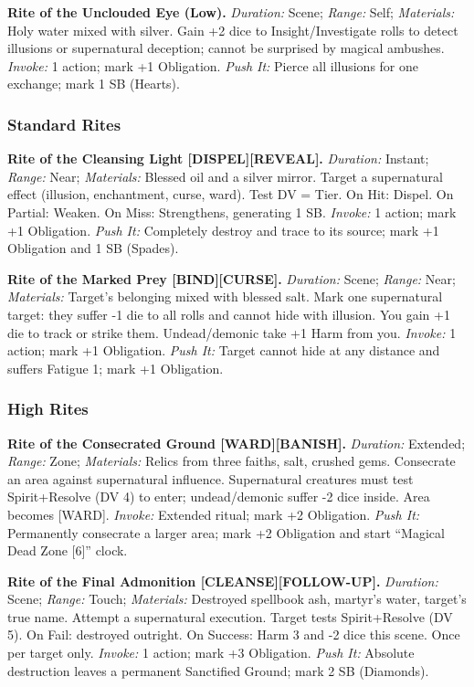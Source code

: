 \textbf{Rite of the Unclouded Eye (Low).}  
\emph{Duration:} Scene; \emph{Range:} Self; \emph{Materials:} Holy water mixed with silver.  
Gain +2 dice to Insight/Investigate rolls to detect illusions or supernatural deception; cannot be surprised by magical ambushes.  
\emph{Invoke:} 1 action; mark +1 Obligation.  
\emph{Push It:} Pierce all illusions for one exchange; mark 1 SB (Hearts).

\subsubsection*{Standard Rites}

\textbf{Rite of the Cleansing Light [DISPEL][REVEAL].}  
\emph{Duration:} Instant; \emph{Range:} Near; \emph{Materials:} Blessed oil and a silver mirror.  
Target a supernatural effect (illusion, enchantment, curse, ward). Test DV = Tier. On Hit: Dispel. On Partial: Weaken. On Miss: Strengthens, generating 1 SB.  
\emph{Invoke:} 1 action; mark +1 Obligation.  
\emph{Push It:} Completely destroy and trace to its source; mark +1 Obligation and 1 SB (Spades).

\textbf{Rite of the Marked Prey [BIND][CURSE].}  
\emph{Duration:} Scene; \emph{Range:} Near; \emph{Materials:} Target’s belonging mixed with blessed salt.  
Mark one supernatural target: they suffer -1 die to all rolls and cannot hide with illusion. You gain +1 die to track or strike them. Undead/demonic take +1 Harm from you.  
\emph{Invoke:} 1 action; mark +1 Obligation.  
\emph{Push It:} Target cannot hide at any distance and suffers Fatigue 1; mark +1 Obligation.

\subsubsection*{High Rites}

\textbf{Rite of the Consecrated Ground [WARD][BANISH].}  
\emph{Duration:} Extended; \emph{Range:} Zone; \emph{Materials:} Relics from three faiths, salt, crushed gems.  
Consecrate an area against supernatural influence. Supernatural creatures must test Spirit+Resolve (DV 4) to enter; undead/demonic suffer -2 dice inside. Area becomes [WARD].  
\emph{Invoke:} Extended ritual; mark +2 Obligation.  
\emph{Push It:} Permanently consecrate a larger area; mark +2 Obligation and start ``Magical Dead Zone [6]'' clock.

\textbf{Rite of the Final Admonition [CLEANSE][FOLLOW-UP].}  
\emph{Duration:} Scene; \emph{Range:} Touch; \emph{Materials:} Destroyed spellbook ash, martyr’s water, target’s true name.  
Attempt a supernatural execution. Target tests Spirit+Resolve (DV 5). On Fail: destroyed outright. On Success: Harm 3 and -2 dice this scene. Once per target only.  
\emph{Invoke:} 1 action; mark +3 Obligation.  
\emph{Push It:} Absolute destruction leaves a permanent Sanctified Ground; mark 2 SB (Diamonds).

